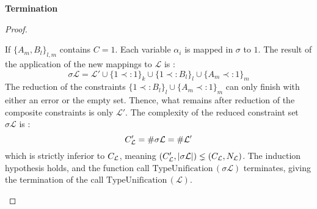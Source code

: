 \begin{thm}{\bf Termination}
\begin{proof}
\begin{itemize}
				If $\{A_m, B_l\}_{l, m}$ contains $C = 1$. Each variable $\alpha_i$ is mapped in $\sigma$ to $1$.
				The result of the application of the new mappings to $\mathcal{L}$ is :
			  	$$\sigma \mathcal{L} = \mathcal{L'} \cup \{1 \prec: 1\}_k \cup \{ 1 \prec: B_l \}_l \cup \{ A_m \prec: 1 \}_m$$
       	The reduction of the constraints $\{ 1 \prec: B_l \}_l \cup \{ A_m \prec: 1 \}_m$ can only finish with either an error or the empty set.
       	Thence, what remains after reduction of the composite constraints is only $\mathcal{L'}$.
       	The complexity of the reduced constraint set $\sigma \mathcal{L}$ is :
			  	$$C_{\mathcal{L}}' = \#\sigma\mathcal{L} = \#\mathcal{L'} $$
			  which is strictly inferior to $C_{\mathcal{L}}$, meaning $(C_{\mathcal{L}}',|\sigma\mathcal{L}|) \lneq (C_{\mathcal{L}}, N_{\mathcal{L}})$.
			  The induction hypothesis holds, and the function call $\text{TypeUnification}\,(\sigma \mathcal{L})$ terminates,
			  giving the termination of the call $\text{TypeUnification}\,(\mathcal{L})$. \\
							

\end{itemize}
\end{proof}
\end{thm}
